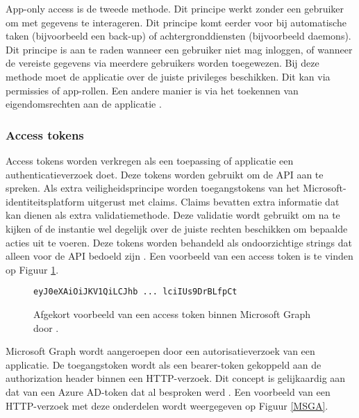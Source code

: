 App-only access is de tweede methode. Dit principe werkt zonder een gebruiker om met gegevens te interageren. Dit principe komt eerder voor bij automatische taken (bijvoorbeeld een back-up) of achtergronddiensten (bijvoorbeeld daemons). Dit principe is aan te raden wanneer een gebruiker niet mag inloggen, of wanneer de vereiste gegevens via meerdere gebruikers worden toegewezen. Bij deze methode moet de applicatie over de juiste privileges beschikken. Dit kan via permissies of app-rollen. Een andere manier is via het toekennen van eigendomsrechten aan de applicatie \autocite{Microsoft2022b}. 

\subsubsection{Access tokens}


Access tokens worden verkregen als een toepassing of applicatie een authenticatieverzoek doet. Deze tokens worden gebruikt om de \ac{API} aan te spreken. Als extra veiligheidsprincipe worden toegangstokens van het Microsoft-identiteitsplatform uitgerust met claims. Claims bevatten extra informatie dat kan dienen als extra validatiemethode. Deze validatie wordt gebruikt om na te kijken of de instantie wel degelijk over de juiste rechten beschikken om bepaalde acties uit te voeren. Deze tokens worden behandeld als ondoorzichtige strings dat alleen voor de \ac{API} bedoeld zijn \autocite{Microsoft2022b}. Een voorbeeld van een access token is te vinden op Figuur \ref{MSGAT}. \\

\begin{figure}[h]
    \scriptsize
    \begin{verbatim}        
eyJ0eXAiOiJKV1QiLCJhb ... lciIUs9DrBLfpCt
    \end{verbatim}    
    \caption[Afgekort voorbeeld Microsoft Graph access token]{Afgekort voorbeeld van een access token binnen Microsoft Graph door \textcite{Microsoft2022b}.}
    \label{MSGAT}
\end{figure}

Microsoft Graph wordt aangeroepen door een autorisatieverzoek van een applicatie. De toegangstoken wordt als een bearer-token gekoppeld aan de authorization header binnen een \ac{HTTP}-verzoek. Dit concept is gelijkaardig aan dat van een Azure \ac{AD}-token dat al besproken werd \autocite{Microsoft2022b}. Een voorbeeld van een \ac{HTTP}-verzoek met deze onderdelen wordt weergegeven op Figuur \ref{MSGA}. \\

